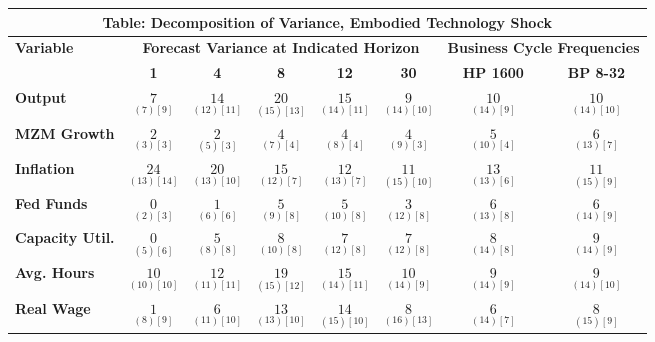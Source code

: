 \documentclass{article}
\begin{document}
 
 \begin{tabular}{|l|c|@{}c|c|@{}c|c|@{}c|c|} 
 \hline 
 \multicolumn{8}{|c|}{\textbf{Table: Decomposition of Variance, Embodied Technology Shock}} \\ \hline 
 \textbf{Variable} & \multicolumn{5}{|c}{\textbf{Forecast Variance at 
 Indicated Horizon}} & \multicolumn{2}{|c|}{\textbf{Business Cycle 
 Frequencies}} \\ \cline{2-8} 
 & \textbf{1} & \textbf{4} & \textbf{8} & \textbf{12} & \textbf{30} & \textbf{%
 HP 1600} & \textbf{BP 8-32} \\ \hline\hline 
 \textbf{Output} & $\underset{(  7) [  9]}{  7}$ & $\underset{( 12) [ 11]}{ 14}$ & $\underset{( 15) [ 13]}{ 20}$ & $\underset{( 14) [ 11]}{ 15}$ & $\underset{( 14) [ 10]}{  9}$ & $\underset{( 14) [  9]}{ 10}$ & $\underset{( 14) [ 10]}{ 10}$ \\ \hline 
 \textbf{MZM Growth} & $\underset{(  3) [  3]}{  2}$ & $\underset{(  5) [  3]}{  2}$ & $\underset{(  7) [  4]}{  4}$ & $\underset{(  8) [  4]}{  4}$ & $\underset{(  9) [  3]}{  4}$ & $\underset{( 10) [  4]}{  5}$ & $\underset{( 13) [  7]}{  6}$ \\ \hline 
 \textbf{Inflation} & $\underset{( 13) [ 14]}{ 24}$ & $\underset{( 13) [ 10]}{ 20}$ & $\underset{( 12) [  7]}{ 15}$ & $\underset{( 13) [  7]}{ 12}$ & $\underset{( 15) [ 10]}{ 11}$ & $\underset{( 13) [  6]}{ 13}$ & $\underset{( 15) [  9]}{ 11}$ \\ \hline 
 \textbf{Fed Funds} & $\underset{(  2) [  3]}{  0}$ & $\underset{(  6) [  6]}{  1}$ & $\underset{(  9) [  8]}{  5}$ & $\underset{( 10) [  8]}{  5}$ & $\underset{( 12) [  8]}{  3}$ & $\underset{( 13) [  8]}{  6}$ & $\underset{( 14) [  9]}{  6}$ \\ \hline 
 \textbf{Capacity Util.} & $\underset{(  5) [  6]}{  0}$ & $\underset{(  8) [  8]}{  5}$ & $\underset{( 10) [  8]}{  8}$ & $\underset{( 12) [  8]}{  7}$ & $\underset{( 12) [  8]}{  7}$ & $\underset{( 14) [  8]}{  8}$ & $\underset{( 14) [  9]}{  9}$ \\ \hline 
 \textbf{Avg. Hours} & $\underset{( 10) [ 10]}{ 10}$ & $\underset{( 11) [ 11]}{ 12}$ & $\underset{( 15) [ 12]}{ 19}$ & $\underset{( 14) [ 11]}{ 15}$ & $\underset{( 14) [  9]}{ 10}$ & $\underset{( 14) [  9]}{  9}$ & $\underset{( 14) [ 10]}{  9}$ \\ \hline 
 \textbf{Real Wage} &  $\underset{(  8) [  9]}{  1}$ & $\underset{( 11) [ 10]}{  6}$ & $\underset{( 13) [ 10]}{ 13}$ & $\underset{( 15) [ 10]}{ 14}$ & $\underset{( 16) [ 13]}{  8}$ & $\underset{( 14) [  7]}{  6}$ & $\underset{( 15) [  9]}{  8}$ \\ \hline 

\end{tabular}
\end{document}
